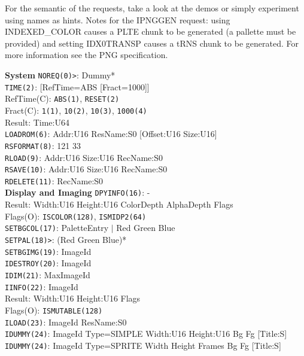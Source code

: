 \documentclass[a4paper,twocolumn,11pt]{article}
\begin{document}
For the semantic of the requests, take a look at the demos
or simply experiment using names as hints.
Notes for the IPNGGEN request:
using INDEXED\_COLOR causes a PLTE chunk to be generated
(a pallette must be provided) and
setting IDX0TRANSP causes a tRNS chunk to be generated.
For more information see the PNG specification.

\clearpage

\begin{flushleft}
{\bf System}
\vskip 2pt
{\tt NOREQ(0)>}: Dummy* \\
\vskip 4pt
{\tt TIME(2)}: [RefTime=ABS [Fract=1000]] \\
RefTime(C): {\tt ABS(1)}, {\tt RESET(2)} \\
Fract(C): {\tt 1(1)}, {\tt 10(2)}, {\tt 10(3)}, {\tt 1000(4)} \\
Result: Time:U64 \\
\vskip 4pt
{\tt LOADROM(6)}: Addr:U16 ResName:S0 [Offset:U16 Size:U16] \\
\vskip 4pt
{\tt RSFORMAT(8)}: 121 33 \\
\vskip 4pt
{\tt RLOAD(9)}: Addr:U16 Size:U16 RecName:S0 \\
\vskip 4pt
{\tt RSAVE(10)}: Addr:U16 Size:U16 RecName:S0 \\
\vskip 4pt
{\tt RDELETE(11)}: RecName:S0 \\
\vskip 6pt
{\bf Display and Imaging}
\vskip 2pt
{\tt DPYINFO(16)}: - \\
Result: Width:U16 Height:U16 ColorDepth AlphaDepth Flags \\
Flags(O): {\tt ISCOLOR(128)}, {\tt ISMIDP2(64)} \\
\vskip 4pt
{\tt SETBGCOL(17)}: PaletteEntry $|$ Red Green Blue \\
\vskip 4pt
{\tt SETPAL(18)>}: (Red Green Blue)* \\
\vskip 4pt
{\tt SETBGIMG(19)}: ImageId \\
\vskip 4pt
{\tt IDESTROY(20)}: ImageId \\
\vskip 4pt
{\tt IDIM(21)}: MaxImageId \\
\vskip 4pt
{\tt IINFO(22)}: ImageId \\
Result: Width:U16 Height:U16 Flags \\
Flags(O): {\tt ISMUTABLE(128)} \\
\vskip 4pt
{\tt ILOAD(23)}: ImageId ResName:S0 \\
\vskip 4pt
{\tt IDUMMY(24)}: ImageId Type=SIMPLE Width:U16 Height:U16 Bg Fg [Title:S] \\
{\tt IDUMMY(24)}: ImageId Type=SPRITE Width Height Frames Bg Fg [Title:S] \\

\end{flushleft}
\end{document}
